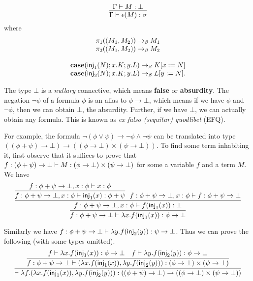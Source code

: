 $$
\infer{\Gamma\proves \epsilon(M): \sigma}{
    \Gamma\proves M:\bot
}
$$
where 
$$
\begin{array}{c}
    \pi_1((M_1, M_2)) \to_\beta M_1 \\
    \pi_2((M_1, M_2)) \to_\beta M_2 \\
    \\
    \text{\bf case}(\text{\sf inj}_1(N);x.K;y.L)\to_\beta K[x:=N] \\ 
    \text{\bf case}(\text{\sf inj}_2(N);x.K;y.L)\to_\beta L[y:=N].
\end{array}
$$

\begin{remark}
    The type $\bot$ is a {\it nullary} connective, which means
    {\bf false} or {\bf absurdity}. The negation $\neg\phi$ of a 
    formula $\phi$ is an alias to $\phi\to\bot$, which means if
    we have $\phi$ and $\neg\phi$, then we can obtain $\bot$, the
    absurdity. Further, if we have $\bot$, we can actually obtain
    any formula. This is known as {\it ex falso (sequitur) quodlibet}
    (EFQ).
\end{remark}

For example, the formula $\neg(\phi\vee\psi)\to\neg \phi\wedge\neg\psi$ 
can be translated into type 
$((\phi+\psi)\to\bot)\to((\phi\to\bot)\times(\psi\to\bot))$.
To find some term inhabiting it, first observe that it suffices to
prove that $f:(\phi+\psi)\to\bot\vdash M:(\phi\to\bot)\times(\psi\to\bot)$
for some a variable $f$ and a term $M$. We have
$$
\infer{f:\phi+\psi\to\bot\proves\lambda x.f(\inj_1(x)):\phi\to\bot}{
    \infer{f:\phi+\psi\to\bot,x:\phi\proves f(\inj_1(x)):\bot}{
        \infer{f:\phi+\psi\to\bot,x:\phi\proves \inj_1(x):\phi+\psi}{
            f:\phi+\psi\to\bot,x:\phi\proves x:\phi
        }
        \ \ 
        f:\phi+\psi\to\bot, x:\phi\proves f:\phi+\psi\to\bot
    }
}
$$

Similarly we have $f:\phi+\psi\to\bot\vdash\lambda y.f(\text{\sf inj}_2(y)):\psi\to\bot$.
Thus we can prove the following (with some types omitted).
$$
\infer{\proves\lambda f.(\lambda x.f(\inj_1(x)),\lambda y.f(\inj_2(y))):((\phi+\psi)\to\bot)\to((\phi\to\bot)\times(\psi\to\bot))}{
    \infer{f:\phi+\psi\to\bot\proves(\lambda x.f(\inj_1(x)),\lambda y.f(\inj_2(y))):(\phi\to\bot)\times(\psi\to\bot)}{
        f\proves\lambda x.f(\inj_1(x)):\phi\to\bot
        &
        f\proves\lambda y.f(\inj_2(y)):\phi\to\bot
    }
}
$$

